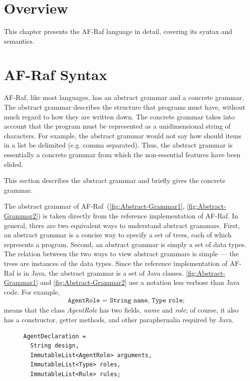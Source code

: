 \documentclass[a4paper,12pt,oneside,fleqn]{book} %
\newcommand{\todo}[1]{[\textcolor{red}{TODO}: #1]}
\begin{document}
{%

\section{Overview}\label{sec:langdef.overview} %

This chapter presents the AF-Raf language in detail, covering its syntax
and semantics.

\section{AF-Raf Syntax}\label{sec:langdef.syntax} %

AF-Raf, like most languages, has an abstract grammar and a concrete
grammar. The abstract grammar describes the structure that programs must
have, without much regard to how they are written down. The concrete
grammar takes into account that the program must be represented as a
unidimensional string of characters. For example, the abstract grammar
would not say how should items in a list be delimited (e.g. comma
separated). Thus, the abstract grammar is essentially a concrete grammar
from which the non-essential features have been elided.

This section describes the abstract grammar and briefly gives the concrete
grammar.

The abstract grammar of AF-Raf~(\autoref{fig:Abstract-Grammar1},
\autoref{fig:Abstract-Grammar2}) is taken
directly from the reference implementation of AF-Raf.  In general, there
are two equivalent ways to understand abstract grammars. First, an abstract
grammar is a concise way to specify a set of trees, each of which
represents a program. Second, an abstract grammar is simply a set of data
types. The relation between the two ways to view abstract grammars is
simple --- the trees are instances of the data types. Since the reference
implementation of AF-Raf is in Java, the abstract grammar is a set of Java
classes. \autoref{fig:Abstract-Grammar1} and \autoref{fig:Abstract-Grammar2} use a notation less verbose than Java code. For example,
\begin{align}
\texttt{AgentRole = String name, Type role;}
\end{align}
means that the class {\it AgentRole\/} has two fields, {\it name\/} and
{\it role}; of course, it also has a constructor, getter methods, and other
paraphernalia required by Java.

\begin{figure}\footnotesize %
\begin{verbatim}
AgentDeclaration =
  String design,
  ImmutableList<AgentRole> arguments,
  ImmutableList<Type> roles,
  ImmutableList<Rule> rules;


\end{verbatim}
\end{figure}}
\end{document}

